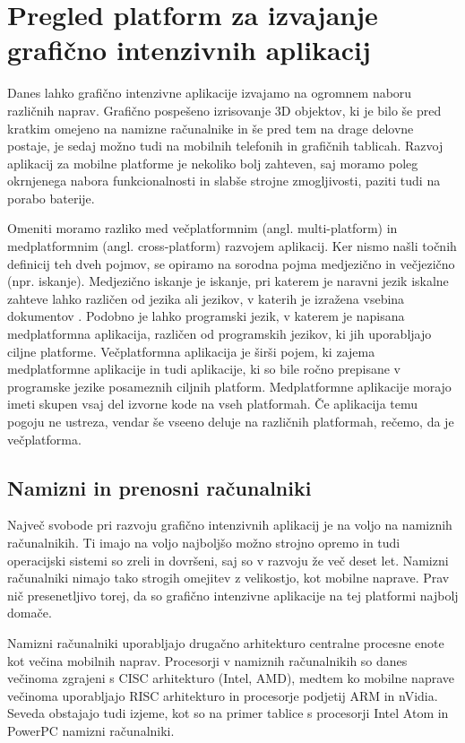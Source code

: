 \chapter{Pregled platform za izvajanje grafično intenzivnih aplikacij}

Danes lahko grafično intenzivne aplikacije izvajamo na ogromnem naboru različnih naprav. Grafično pospešeno izrisovanje 3D objektov, ki je bilo še pred kratkim omejeno na namizne računalnike in še pred tem na drage delovne postaje, je sedaj možno tudi na mobilnih telefonih in grafičnih tablicah. Razvoj aplikacij za mobilne platforme je nekoliko bolj zahteven, saj moramo poleg okrnjenega nabora funkcionalnosti in slabše strojne zmogljivosti, paziti tudi na porabo baterije.

Omeniti moramo razliko med večplatformnim (angl. multi-platform) in medplatformnim (angl. cross-platform) razvojem aplikacij. Ker nismo našli točnih definicij teh dveh pojmov, se opiramo na sorodna pojma medjezično in večjezično (npr. iskanje). Medjezično iskanje je iskanje, pri katerem je naravni jezik iskalne zahteve lahko različen od jezika ali jezikov, v katerih je izražena vsebina dokumentov \cite{jezicno}. Podobno je lahko programski jezik, v katerem je napisana medplatformna aplikacija, različen od programskih jezikov, ki jih uporabljajo ciljne platforme. Večplatformna aplikacija je širši pojem, ki zajema medplatformne aplikacije in tudi aplikacije, ki so bile ročno prepisane v programske jezike posameznih ciljnih platform. Medplatformne aplikacije morajo imeti skupen vsaj del izvorne kode na vseh platformah. Če aplikacija temu pogoju ne ustreza, vendar še vseeno deluje na različnih platformah, rečemo, da je večplatforma.

\section{Namizni in prenosni računalniki}

Največ svobode pri razvoju grafično intenzivnih aplikacij je na voljo na namiznih računalnikih. Ti imajo na voljo najboljšo možno strojno opremo in tudi operacijski sistemi so zreli in dovršeni, saj so v razvoju že več deset let. Namizni računalniki nimajo tako strogih omejitev z velikostjo, kot mobilne naprave. Prav nič presenetljivo torej, da so grafično intenzivne aplikacije na tej platformi najbolj domače. 

Namizni računalniki uporabljajo drugačno arhitekturo centralne procesne enote kot večina mobilnih naprav. Procesorji v namiznih računalnikih so danes večinoma  zgrajeni s CISC arhitekturo (Intel, AMD), medtem ko mobilne naprave večinoma uporabljajo RISC arhitekturo in procesorje podjetij ARM in nVidia. Seveda obstajajo tudi izjeme, kot so na primer tablice s procesorji Intel Atom in PowerPC namizni računalniki.  


